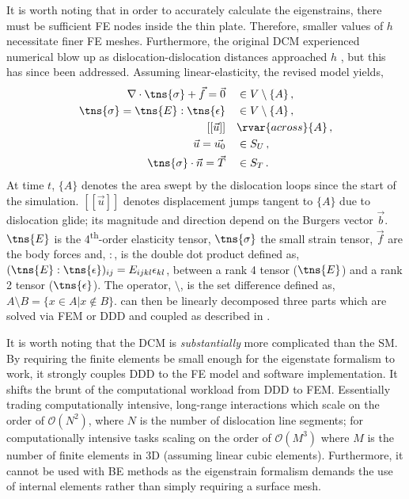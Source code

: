 It is worth noting that in order to accurately calculate the eigenstrains, there must be sufficient FE nodes inside the thin plate. Therefore, smaller values of $ h $ necessitate finer FE meshes. Furthermore, the original DCM experienced numerical blow up as dislocation-dislocation distances approached $ h $ \cite{dcm0}, but this has since been addressed. Assuming linear-elasticity, the revised model \cite{dcm} yields,
\begin{subequations}\label{eq:discrete_continuum}
  \begin{align}
    \nabla \cdot \tns{\sigma} + \vec{f} = \vec{0} \quad & \in V \setminus \{A\}\,, \\
    \tns{\sigma} = \tns{E} : \tns{\epsilon} \quad       & \in V \setminus \{A\}\,, \\
    [[\vec{u}]] \quad                                   & \rvar{across } \{A\}\,,  \\
    \vec{u} = \vec{u_{0}} \quad                         & \in S_{U}\,,             \\
    \tns{\sigma} \cdot \vec{n} = \vec{T} \quad          & \in S_{T}\,.
  \end{align}
\end{subequations}
At time $ t $, $ \{A\} $ denotes the area swept by the dislocation loops since the start of the simulation. $ [[\vec{u}]] $ denotes displacement jumps tangent to $ \{A\} $ due to dislocation glide; its magnitude and direction depend on the Burgers vector $ \vec{b} $. $ \tns{E} $ is the 4\textsuperscript{th}-order elasticity tensor, $ \tns{\sigma} $ the small strain tensor, $ \vec{f} $ are the body forces and, $ : $, is the double dot product defined as, $ (\tns{E}:\tns{\epsilon})_{ij} = E_{ijkl}\epsilon_{kl} $, between a rank 4 tensor ($ \tns{E} $) and a rank 2 tensor ($ \tns{\epsilon} $). The operator, $ \setminus $, is the set difference defined as, $ A \setminus B = \{x \in A | x \notin B\} $.  can then be linearly decomposed three parts which are solved via FEM or DDD and coupled as described in \cite{dcm}.

It is worth noting that the DCM is \emph{substantially} more complicated than the SM. By requiring the finite elements be small enough for the eigenstate formalism to work, it strongly couples DDD to the FE model and software implementation. It shifts the brunt of the computational workload from DDD to FEM. Essentially trading computationally intensive, long-range interactions which scale on the order of $ \mathcal{O}(N^{2}) $, where $ N $ is the number of dislocation line segments; for computationally intensive tasks scaling on the order of $ \mathcal{O}(M^{3}) $ where $ M $ is the number of finite elements in 3D (assuming linear cubic elements). Furthermore, it cannot be used with BE methods as the eigenstrain formalism demands the use of internal elements rather than simply requiring a surface mesh.

